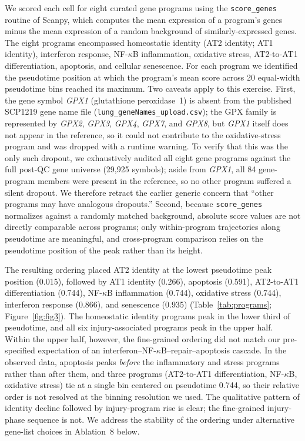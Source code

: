 \documentclass[11pt]{article}
\begin{document}
We scored each cell for eight curated gene programs using the \texttt{score\_genes} routine of Scanpy, which computes the mean expression of a program's genes minus the mean expression of a random background of similarly-expressed genes. The eight programs encompassed homeostatic identity (AT2 identity; AT1 identity), interferon response, NF-$\kappa$B inflammation, oxidative stress, AT2-to-AT1 differentiation, apoptosis, and cellular senescence. For each program we identified the pseudotime position at which the program's mean score across 20 equal-width pseudotime bins reached its maximum. Two caveats apply to this exercise. First, the gene symbol \textit{GPX1} (glutathione peroxidase~1) is absent from the published SCP1219 gene name file (\texttt{lung\_geneNames\_upload.csv}); the GPX family is represented by \textit{GPX2}, \textit{GPX3}, \textit{GPX4}, \textit{GPX7}, and \textit{GPX8}, but \textit{GPX1} itself does not appear in the reference, so it could not contribute to the oxidative-stress program and was dropped with a runtime warning. To verify that this was the only such dropout, we exhaustively audited all eight gene programs against the full post-QC gene universe (29{,}925 symbols); aside from \textit{GPX1}, all 84 gene-program members were present in the reference, so no other program suffered a silent dropout. We therefore retract the earlier generic concern that ``other programs may have analogous dropouts.'' Second, because \texttt{score\_genes} normalizes against a randomly matched background, absolute score values are not directly comparable across programs; only within-program trajectories along pseudotime are meaningful, and cross-program comparison relies on the pseudotime position of the peak rather than its height.

The resulting ordering placed AT2 identity at the lowest pseudotime peak position (0.015), followed by AT1 identity (0.266), apoptosis (0.591), AT2-to-AT1 differentiation (0.744), NF-$\kappa$B inflammation (0.744), oxidative stress (0.744), interferon response (0.866), and senescence (0.935) (Table~\ref{tab:programs}; Figure~\ref{fig:fig3}). The homeostatic identity programs peak in the lower third of pseudotime, and all six injury-associated programs peak in the upper half. Within the upper half, however, the fine-grained ordering did not match our pre-specified expectation of an interferon--NF-$\kappa$B--repair--apoptosis cascade. In the observed data, apoptosis peaks \emph{before} the inflammatory and stress programs rather than after them, and three programs (AT2-to-AT1 differentiation, NF-$\kappa$B, oxidative stress) tie at a single bin centered on pseudotime 0.744, so their relative order is not resolved at the binning resolution we used. The qualitative pattern of identity decline followed by injury-program rise is clear; the fine-grained injury-phase sequence is not. We address the stability of the ordering under alternative gene-list choices in Ablation~8 below.
\end{document}
